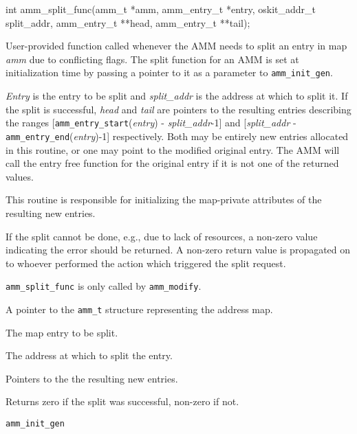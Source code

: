 \begin{apisyn}

	\funcproto int amm_split_func(amm_t *amm, amm_entry_t *entry,
			oskit_addr_t split_addr,
			\outparam amm_entry_t **head,
			\outparam amm_entry_t **tail);
\end{apisyn}
\begin{apidesc}
	User-provided function called whenever the AMM needs to split
	an entry in map \emph{amm} due to conflicting flags.
	The split function for an AMM is set at initialization time
	by passing a pointer to it as a parameter to {\tt amm_init_gen}.

	\emph{Entry} is the entry to be split and \emph{split_addr}
	is the address at which to split it.
	If the split is successful,
	\emph{head} and \emph{tail} are pointers to the resulting entries
	describing the ranges
	[{\tt amm_entry_start}(\emph{entry}) - \emph{split_addr}-1]
	and
	[\emph{split_addr} - {\tt amm_entry_end}(\emph{entry})-1]
	respectively.
	Both may be entirely new entries allocated in this routine,
	or one may point to the modified original entry.
	The AMM will call the entry free function for the original
	entry if it is not one of the returned values.

	This routine is responsible for initializing the map-private
	attributes of the resulting new entries.

	If the split cannot be done, e.g., due to lack of resources,
	a non-zero value indicating the error should be returned.
	A non-zero return value is propagated on to whoever performed
	the action which triggered the split request.

	{\tt amm_split_func} is only called by {\tt amm_modify}.
\end{apidesc}
\begin{apiparm}
	\item[amm]
		A pointer to the {\tt amm_t} structure
		representing the address map.
	\item[entry]
		The map entry to be split.
	\item[split_addr]
		The address at which to split the entry.
	\item[head,tail]
		Pointers to the the resulting new entries.
\end{apiparm}
\begin{apiret}
	Returns zero if the split was successful, non-zero if not.
\end{apiret}
\begin{apirel}
	{\tt amm_init_gen}
\end{apirel}

